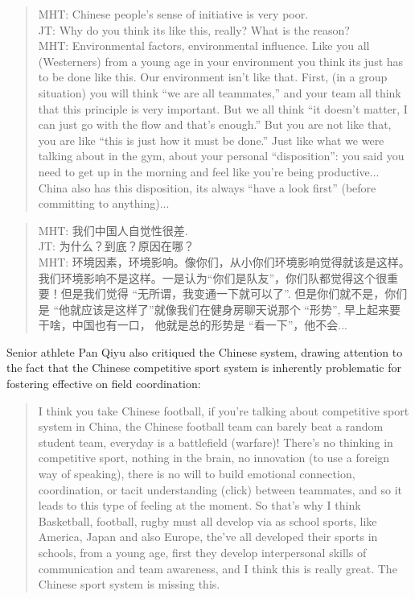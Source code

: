 \begin{CJK}{UTF8}{gbsn}
\begin{quotation}
  MHT: Chinese people's sense of initiative is very poor.\\
  JT: Why do you think its like this, really? What is the reason? \\ MHT: Environmental factors, environmental influence.  Like you all (Westerners) from a young age in your environment you think its just has to be done like this.  Our environment isn’t like that.  First, (in a group situation) you will think ``we are all teammates,'' and your team all think that this principle is very important.  But we all think ``it doesn’t matter, I can just go with the flow and that’s enough.''  But you are not like that, you are like ``this is just how it must be done.'' Just like what we were talking about in the gym, about your personal ``disposition'': you said you need to get up in the morning and feel like you're being productive... China also has this disposition, its always ``have a look first'' (before committing to anything)...
\end{quotation}

\begin{quotation}
  MHT: 我们中国人自觉性很差. \\
  JT: 为什么？到底？原因在哪？\\
  MHT: 环境因素，环境影响。像你们，从小你们环境影响觉得就该是这样。我们环境影响不是这样。一是认为``你们是队友''，你们队都觉得这个很重要！但是我们觉得 ``无所谓，我变通一下就可以了''. 但是你们就不是，你们是 ``他就应该是这样了''就像我们在健身房聊天说那个 ``形势'', 早上起来要干啥，中国也有一口， 他就是总的形势是  ``看一下''，他不会...
\end{quotation}


Senior athlete Pan Qiyu also critiqued the Chinese system, drawing attention to the fact that the Chinese competitive sport system is inherently problematic for fostering effective on field coordination:

\begin{quotation}
  I think you take Chinese football, if you’re talking about competitive sport system in China, the Chinese football team can barely beat a random student team, everyday is a battlefield (warfare)! There’s no thinking in competitive sport, nothing in the brain, no innovation (to use a foreign way of speaking), there is no will to build emotional connection, coordination, or tacit understanding (click) between teammates, and so it leads to this type of feeling at the moment.  So that's why I think Basketball, football, rugby must all develop via as school sports, like America, Japan and also Europe, the’ve all developed their sports in schools, from a young age, first they develop interpersonal skills of communication and team awareness, and I think this is really great.  The Chinese sport system is missing this.
\end{quotation}


\end{CJK}
